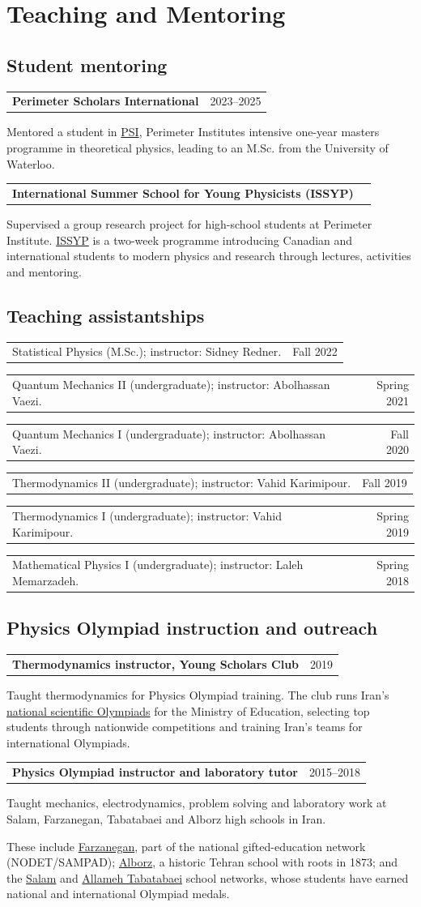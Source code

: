 \documentclass[10pt,letterpaper]{article}
\makeatletter
\newcommand{\dated}[2]{\par\begin{tabularx}{\linewidth}{@{}>{\raggedright\arraybackslash}X@{\hspace{12pt}}r@{}}#1 & \textcolor{muted}{#2}\\\end{tabularx}\par}
\newcommand{\entry}[3]{\needspace{46pt}\dated{\textbf{#1}}{#2}#3\par\vspace{3pt}}
\newcommand{\course}[4]{\needspace{22pt}\dated{#1 \textcolor{muted}{(#2)}; instructor: #3.}{#4}\vspace{2pt}}
\makeatother
\begin{document}
\Needspace{95pt}
\section{Teaching and Mentoring}
\subsection{Student mentoring}
\entry{Perimeter Scholars International}{2023--2025}{
Mentored a student in \href{https://perimeterinstitute.ca/training/masters-program}{PSI}, Perimeter Institute\textquotesingle s intensive one-year master\textquotesingle s programme in theoretical physics, leading to an M.Sc. from the University of Waterloo.}
\entry{International Summer School for Young Physicists (ISSYP)}{}{
Supervised a group research project for high-school students at Perimeter Institute. \href{https://perimeterinstitute.ca/news/summer-program-launches-bright-futures-for-young-physicists}{ISSYP} is a two-week programme introducing Canadian and international students to modern physics and research through lectures, activities and mentoring.}

\Needspace{115pt}
\subsection{Teaching assistantships}
\course{Statistical Physics}{M.Sc.}{Sidney Redner}{Fall 2022}
\course{Quantum Mechanics II}{undergraduate}{Abolhassan Vaezi}{Spring 2021}
\course{Quantum Mechanics I}{undergraduate}{Abolhassan Vaezi}{Fall 2020}
\course{Thermodynamics II}{undergraduate}{Vahid Karimipour}{Fall 2019}
\course{Thermodynamics I}{undergraduate}{Vahid Karimipour}{Spring 2019}
\course{Mathematical Physics I}{undergraduate}{Laleh Memarzadeh}{Spring 2018}

\subsection{Physics Olympiad instruction and outreach}
\entry{Thermodynamics instructor, Young Scholars Club}{2019}{
Taught thermodynamics for Physics Olympiad training. The club runs Iran's \href{https://ioi2017.ir/files/volume11si.pdf}{national scientific Olympiads} for the Ministry of Education, selecting top students through nationwide competitions and training Iran's teams for international Olympiads.}
\entry{Physics Olympiad instructor and laboratory tutor}{2015--2018}{
Taught mechanics, electrodynamics, problem solving and laboratory work at Salam, Farzanegan, Tabatabaei and Alborz high schools in Iran.\par
These include \href{https://en.wikipedia.org/wiki/Tehran_Farzanegan_School}{Farzanegan}, part of the national gifted-education network (NODET/SAMPAD); \href{https://www.iranicaonline.org/articles/alborz-college/}{Alborz}, a historic Tehran school with roots in 1873; and the \href{https://salamsch.org/olympiad-results/}{Salam} and \href{https://mat.ir/}{Allameh Tabatabaei} school networks, whose students have earned national and international Olympiad medals.}
\end{document}
